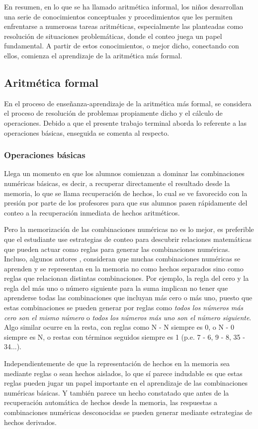 \documentclass{article}
\begin{document}
En resumen, en lo que se ha llamado aritmética informal, los niños desarrollan una serie de conocimientos conceptuales y procedimientos que les permiten enfrentarse a numerosas tareas aritméticas, especialmente las planteadas como resolución de situaciones problemáticas, donde el conteo juega un papel fundamental. A partir de estos conocimientos, o mejor dicho, conectando con ellos, comienza el aprendizaje de la aritmética más formal.

\subsection{Aritmética formal} 
En el proceso de enseñanza-aprendizaje de la aritmética más formal, se considera el  proceso de resolución de problemas propiamente dicho y el cálculo de operaciones. Debido a que el presente trabajo terminal aborda lo referente a las operaciones básicas, enseguida se comenta al respecto.
\subsubsection{Operaciones básicas}
Llega un momento en que los alumnos comienzan a dominar las combinaciones numéricas básicas, es decir, a recuperar directamente el resultado desde la memoria, lo que se llama recuperación de hechos, lo cual se ve favorecido con la presión por parte de los profesores para que sus alumnos pasen rápidamente del conteo a la recuperación inmediata de hechos aritméticos.

Pero la memorización de las combinaciones numéricas no es lo mejor, es preferible que el estudiante use estrategias de conteo para descubrir relaciones matemáticas que pueden actuar como reglas para generar las combinaciones numéricas. Incluso, algunos autores \cite{fuson1996levels}, consideran que muchas combinaciones numéricas se aprenden y se representan en la memoria no como hechos separados sino como reglas que relacionan distintas combinaciones. Por ejemplo, la regla del cero y la regla del más uno o número siguiente para la suma implican no tener que aprenderse todas las combinaciones que incluyan más cero o más uno, puesto que estas combinaciones se pueden generar por reglas como \emph{todos los números más cero son el mismo número} o \emph{todos los números más uno son el número siguiente}. Algo similar ocurre en la resta, con reglas como N - N siempre es 0, o N - 0 siempre es N, o restas con términos seguidos siempre es 1 (p.e. 7 - 6, 9 - 8, 35 - 34...).

Independientemente de que la representación de hechos en la memoria sea mediante reglas o sean hechos aislados, lo que sí parece indudable es que estas reglas pueden jugar un papel importante en el aprendizaje de las combinaciones numéricas básicas. Y también parece un hecho constatado que antes de la recuperación automática de hechos desde la memoria, las respuestas a combinaciones numéricas desconocidas se pueden generar mediante estrategias de hechos derivados.
\end{document}

